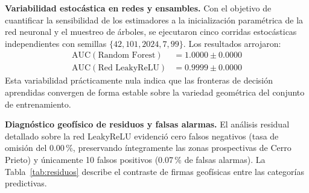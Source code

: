 \documentclass[10pt,twocolumn,letterpaper]{article}
\newcommand{\AUC}{\mathrm{AUC}}
\begin{document}
\begin{table}[htbp]
\centering
\caption{Evaluación comparativa en el conjunto de prueba independiente (13{,}473 píxeles, prevalencia natural 27.63\,\%).}
\label{tab:resultados_test}
\end{table}

\textbf{Variabilidad estocástica en redes y ensambles.}
Con el objetivo de cuantificar la sensibilidad de los estimadores a la inicialización paramétrica de la red neuronal y el muestreo de árboles, se ejecutaron cinco corridas estocásticas independientes con semillas $\{42, 101, 2024, 7, 99\}$. Los resultados arrojaron:
\begin{align*}
  \AUC(\text{Random Forest}) &= 1.0000 \pm 0.0000 \\
  \AUC(\text{Red LeakyReLU}) &= 0.9999 \pm 0.0000
\end{align*}
Esta variabilidad prácticamente nula indica que las fronteras de decisión aprendidas convergen de forma estable sobre la variedad geométrica del conjunto de entrenamiento.

\textbf{Diagnóstico geofísico de residuos y falsas alarmas.}
El análisis residual detallado sobre la red LeakyReLU evidenció cero falsos negativos (tasa de omisión del 0.00\,\%, preservando íntegramente las zonas prospectivas de Cerro Prieto) y únicamente 10 falsos positivos (0.07\,\% de falsas alarmas). La Tabla~\ref{tab:residuos} describe el contraste de firmas geofísicas entre las categorías predictivas.
\end{document}
